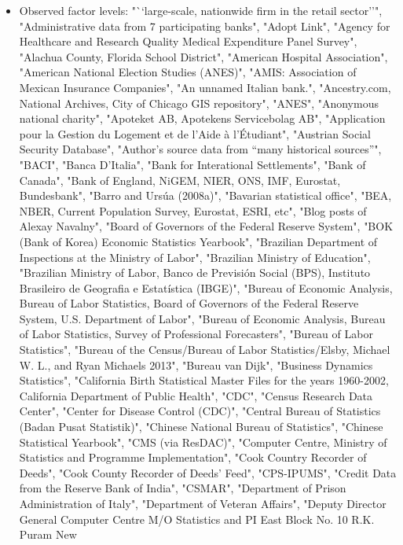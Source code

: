\documentclass[]{article}
\providecommand{\tightlist}{%
  \setlength{\itemsep}{0pt}\setlength{\parskip}{0pt}}
\begin{document}
\begin{itemize}
\tightlist
\item
  Observed factor levels: "``large-scale, nationwide firm in the retail
  sector''", "Administrative data from 7 participating banks", "Adopt
  Link", "Agency for Healthcare and Research Quality Medical Expenditure
  Panel Survey", "Alachua County, Florida School District", "American
  Hospital Association", "American National Election Studies (ANES)",
  "AMIS: Association of Mexican Insurance Companies", "An unnamed
  Italian bank.", "Ancestry.com, National Archives, City of Chicago GIS
  repository", "ANES", "Anonymous national charity", "Apoteket AB,
  Apotekens Servicebolag AB", "Application pour la Gestion du Logement
  et de l'Aide à l'Étudiant", "Austrian Social Security Database",
  "Author's source data from ``many historical sources''", "BACI",
  "Banca D'Italia", "Bank for Interational Settlements", "Bank of
  Canada", "Bank of England, NiGEM, NIER, ONS, IMF, Eurostat,
  Bundesbank", "Barro and Ursúa (2008a)", "Bavarian statistical office",
  "BEA, NBER, Current Population Survey, Eurostat, ESRI, etc", "Blog
  posts of Alexay Navalny", "Board of Governors of the Federal Reserve
  System", "BOK (Bank of Korea) Economic Statistics Yearbook",
  "Brazilian Department of Inspections at the Ministry of Labor",
  "Brazilian Ministry of Education", "Brazilian Ministry of Labor, Banco
  de Previsión Social (BPS), Instituto Brasileiro de Geografia e
  Estatística (IBGE)", "Bureau of Economic Analysis, Bureau of Labor
  Statistics, Board of Governors of the Federal Reserve System, U.S.
  Department of Labor", "Bureau of Economic Analysis, Bureau of Labor
  Statistics, Survey of Professional Forecasters", "Bureau of Labor
  Statistics", "Bureau of the Census/Bureau of Labor Statistics/Elsby,
  Michael W. L., and Ryan Michaels 2013", "Bureau van Dijk", "Business
  Dynamics Statistics", "California Birth Statistical Master Files for
  the years 1960-2002, California Department of Public Health", "CDC",
  "Census Research Data Center", "Center for Disease Control (CDC)",
  "Central Bureau of Statistics (Badan Pusat Statistik)", "Chinese
  National Bureau of Statistics", "Chinese Statistical Yearbook", "CMS
  (via ResDAC)", "Computer Centre, Ministry of Statistics and Programme
  Implementation", "Cook Country Recorder of Deeds", "Cook County
  Recorder of Deeds' Feed", "CPS-IPUMS", "Credit Data from the Reserve
  Bank of India", "CSMAR", "Department of Prison Administration of
  Italy", "Department of Veteran Affairs", "Deputy Director General
  Computer Centre M/O Statistics and PI East Block No. 10 R.K. Puram New

\end{itemize}
\end{document}
